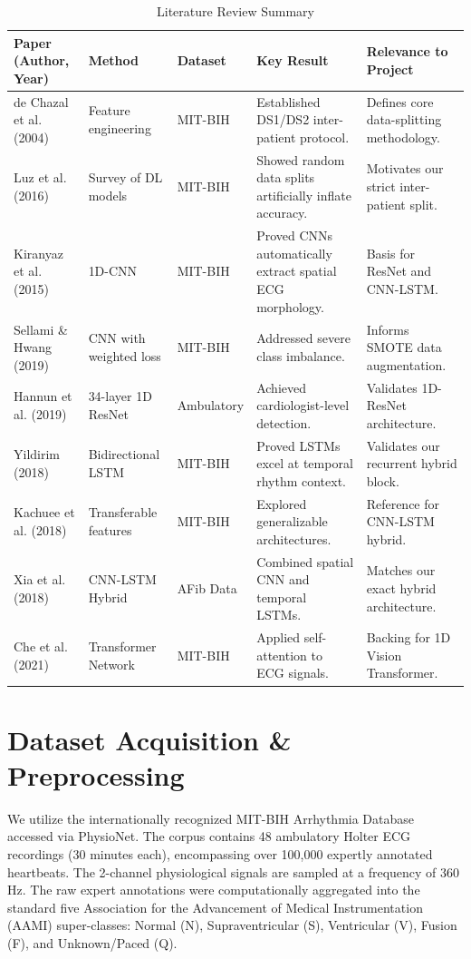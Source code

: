 \documentclass[11pt, conference]{IEEEtran}
\begin{document}
\begin{table}[t]
\centering
\caption{Literature Review Summary}
\label{tab:lit_review}
\begin{tabular}{|p{3.5cm}|p{3.5cm}|p{2cm}|p{4.5cm}|p{4cm}|}
\hline
\textbf{Paper (Author, Year)} & \textbf{Method} & \textbf{Dataset} & \textbf{Key Result} & \textbf{Relevance to Project} \\ \hline
de Chazal et al. (2004) \cite{dechazal} & Feature engineering & MIT-BIH & Established DS1/DS2 inter-patient protocol. & Defines core data-splitting methodology. \\ \hline
Luz et al. (2016) \cite{luz} & Survey of DL models & MIT-BIH & Showed random data splits artificially inflate accuracy. & Motivates our strict inter-patient split. \\ \hline
Kiranyaz et al. (2015) \cite{kiranyaz} & 1D-CNN & MIT-BIH & Proved CNNs automatically extract spatial ECG morphology. & Basis for ResNet and CNN-LSTM. \\ \hline
Sellami \& Hwang (2019) \cite{sellami} & CNN with weighted loss & MIT-BIH & Addressed severe class imbalance. & Informs SMOTE data augmentation. \\ \hline
Hannun et al. (2019) \cite{hannun} & 34-layer 1D ResNet & Ambulatory & Achieved cardiologist-level detection. & Validates 1D-ResNet architecture. \\ \hline
Yildirim (2018) \cite{yildirim} & Bidirectional LSTM & MIT-BIH & Proved LSTMs excel at temporal rhythm context. & Validates our recurrent hybrid block. \\ \hline
Kachuee et al. (2018) \cite{kachuee} & Transferable features & MIT-BIH & Explored generalizable architectures. & Reference for CNN-LSTM hybrid. \\ \hline
Xia et al. (2018) \cite{xia} & CNN-LSTM Hybrid & AFib Data & Combined spatial CNN and temporal LSTMs. & Matches our exact hybrid architecture. \\ \hline
Che et al. (2021) \cite{che} & Transformer Network & MIT-BIH & Applied self-attention to ECG signals. & Backing for 1D Vision Transformer. \\ \hline
\end{tabular}
\end{table}

\section{Dataset Acquisition \& Preprocessing}
We utilize the internationally recognized MIT-BIH Arrhythmia Database accessed via PhysioNet. The corpus contains 48 ambulatory Holter ECG recordings (30 minutes each), encompassing over 100,000 expertly annotated heartbeats. The 2-channel physiological signals are sampled at a frequency of 360 Hz. The raw expert annotations were computationally aggregated into the standard five Association for the Advancement of Medical Instrumentation (AAMI) super-classes: Normal (N), Supraventricular (S), Ventricular (V), Fusion (F), and Unknown/Paced (Q). 
\end{document}

